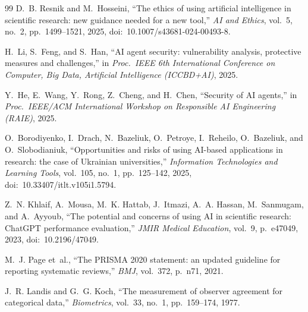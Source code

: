 \documentclass[sn-basic,Numbered]{sn-jnl}
\begin{document}
\begin{thebibliography}{99}
D.~B. Resnik and M.~Hosseini,
``The ethics of using artificial intelligence in scientific research:
new guidance needed for a new tool,''
\emph{AI and Ethics}, vol.~5, no.~2, pp.~1499--1521, 2025,
doi:~10.1007/s43681-024-00493-8.

H.~Li, S.~Feng, and S.~Han,
``AI agent security: vulnerability analysis, protective measures and
challenges,''
in \emph{Proc.\ IEEE 6th International Conference on Computer, Big
Data, Artificial Intelligence (ICCBD+AI)}, 2025.

Y.~He, E.~Wang, Y.~Rong, Z.~Cheng, and H.~Chen,
``Security of AI agents,''
in \emph{Proc.\ IEEE/ACM International Workshop on Responsible AI
Engineering (RAIE)}, 2025.

O.~Borodiyenko, I.~Drach, N.~Bazeliuk, O.~Petroye, I.~Reheilo,
O.~Bazeliuk, and O.~Slobodianiuk,
``Opportunities and risks of using AI-based applications in research:
the case of Ukrainian universities,''
\emph{Information Technologies and Learning Tools}, vol.~105, no.~1,
pp.~125--142, 2025, doi:~10.33407/itlt.v105i1.5794.

Z.~N. Khlaif, A.~Mousa, M.~K. Hattab, J.~Itmazi, A.~A. Hassan,
M.~Sanmugam, and A.~Ayyoub,
``The potential and concerns of using AI in scientific research:
ChatGPT performance evaluation,''
\emph{JMIR Medical Education}, vol.~9, p.~e47049, 2023,
doi:~10.2196/47049.

M.~J. Page et~al.,
``The PRISMA 2020 statement: an updated guideline for reporting
systematic reviews,''
\emph{BMJ}, vol.~372, p.~n71, 2021.

J.~R. Landis and G.~G. Koch,
``The measurement of observer agreement for categorical data,''
\emph{Biometrics}, vol.~33, no.~1, pp.~159--174, 1977.

\end{thebibliography}
\end{document}
